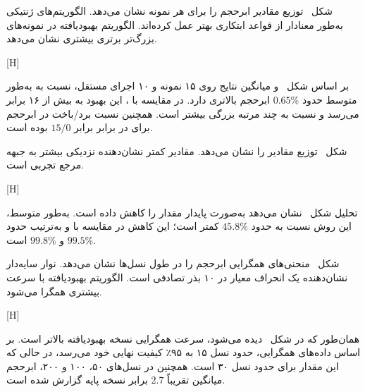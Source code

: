 
شکل~ توزیع مقادیر ابرحجم را برای هر نمونه نشان می‌دهد.
الگوریتم‌های ژنتیکی به‌طور معنادار از قواعد ابتکاری بهتر عمل کرده‌اند.
الگوریتم بهبودیافته در نمونه‌های بزرگ‌تر برتری بیشتری نشان می‌دهد.

[H]

بر اساس شکل~ و میانگین نتایج روی ۱۵ نمونه و ۱۰ اجرای مستقل،
 نسبت به  به‌طور متوسط حدود $0.65\%$ ابرحجم بالاتری دارد.
در مقایسه با ، این بهبود به بیش از ۱۶ برابر می‌رسد و نسبت به
 چند مرتبه بزرگی بیشتر است. همچنین نسبت برد/باخت در ابرحجم
برای  در برابر  برابر $15/0$ بوده است.


شکل~ توزیع مقادیر  را نشان می‌دهد.
مقادیر کمتر نشان‌دهنده نزدیکی بیشتر به جبهه مرجع تجربی است.

[H]

تحلیل شکل~ نشان می‌دهد 
به‌صورت پایدار مقدار  را کاهش داده است. به‌طور متوسط،
 این روش نسبت به  حدود $45.8\%$ کمتر است؛
این کاهش در مقایسه با  و 
به‌ترتیب حدود $99.5\%$ و $99.8\%$ است.


شکل~ منحنی‌های همگرایی ابرحجم را در طول نسل‌ها نشان می‌دهد.
نوار سایه‌دار نشان‌دهنده یک انحراف معیار در ۱۰ بذر تصادفی است.
الگوریتم بهبودیافته با سرعت بیشتری همگرا می‌شود.

[H]

همان‌طور که در شکل~ دیده می‌شود، سرعت همگرایی نسخه بهبودیافته بالاتر است.
بر اساس داده‌های همگرایی،  حدود نسل ۱۵ به ۹۵٪ کیفیت نهایی خود می‌رسد،
در حالی که این مقدار برای  حدود نسل ۳۰ است. همچنین در نسل‌های ۵۰، ۱۰۰ و ۲۰۰،
ابرحجم میانگین  تقریباً $2.7$ برابر نسخه پایه گزارش شده است.


